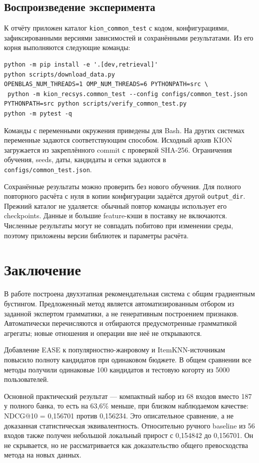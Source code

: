 \documentclass[12pt,a4paper]{article}
\newcommand{\code}[1]{\nolinkurl{#1}}
\begin{document}
\subsection{Воспроизведение эксперимента}
К отчёту приложен каталог \code{kion_common_test} с кодом, конфигурациями,
зафиксированными версиями зависимостей и сохранёнными результатами.
Из его корня выполняются следующие команды:
\begin{small}\begin{verbatim}
python -m pip install -e '.[dev,retrieval]'
python scripts/download_data.py
OPENBLAS_NUM_THREADS=1 OMP_NUM_THREADS=6 PYTHONPATH=src \
 python -m kion_recsys.common_test --config configs/common_test.json
PYTHONPATH=src python scripts/verify_common_test.py
python -m pytest -q
\end{verbatim}\end{small}
Команды с переменными окружения приведены для Bash. На других системах
переменные задаются соответствующим способом. Исходный архив KION
загружается из закреплённого commit с проверкой SHA-256. Ограничения
обучения, seeds, даты, кандидаты и сетки задаются в
\code{configs/common_test.json}.

Сохранённые результаты можно проверить без нового обучения. Для полного
повторного расчёта с нуля в копии конфигурации задаётся другой
\code{output_dir}. Прежний каталог не удаляется: обычный повтор команды
использует его checkpoints. Данные и большие feature-кэши в поставку
не включаются. Численные результаты могут не совпадать побитово при
изменении среды, поэтому приложены версии библиотек и параметры расчёта.

\section{Заключение}
В работе построена двухэтапная рекомендательная система с общим
градиентным бустингом. Предложенный метод является автоматизированным
отбором из заданной экспертом грамматики, а не генеративным построением
признаков. Автоматически перечисляются и отбираются предусмотренные
грамматикой агрегаты; новые отношения и операции вне неё не открываются.

Добавление EASE к популярностно-жанровому и ItemKNN-источникам повысило
полноту кандидатов при одинаковом бюджете. В общем сравнении все методы
получили одинаковые 100 кандидатов и тестовую когорту из 5000 пользователей.

Основной практический результат — компактный набор из 68 входов вместо
187 у полного банка, то есть на 63,6\% меньше, при близком наблюдаемом
качестве: NDCG@10 = 0,156701 против 0,156234. Это описательное сравнение,
а не доказанная статистическая эквивалентность. Относительно ручного
baseline из 56 входов также получен небольшой локальный прирост
с 0,154842 до 0,156701. Он не скрывается, но не рассматривается как
доказательство общего превосходства метода на новых данных.
\end{document}
